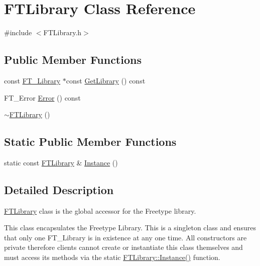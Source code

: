 \hypertarget{class_f_t_library}{}\section{F\+T\+Library Class Reference}
\label{class_f_t_library}


{\ttfamily \#include $<$F\+T\+Library.\+h$>$}

\subsection*{Public Member Functions}
\begin{DoxyCompactItemize}
\item 
const \hyperlink{struct_f_t___library_rec__}{F\+T\+\_\+\+Library} $\ast$const \hyperlink{class_f_t_library_afef4db019eae5a4307201b7abc6a88c7}{Get\+Library} () const 
\item 
F\+T\+\_\+\+Error \hyperlink{class_f_t_library_ad01e538ba8e308dddda5c4ec808ee404}{Error} () const 
\item 
\hyperlink{class_f_t_library_a8d1ee3dc3c4916b5b428e934dc46e9d7}{$\sim$\+F\+T\+Library} ()
\end{DoxyCompactItemize}
\subsection*{Static Public Member Functions}
\begin{DoxyCompactItemize}
\item 
static const \hyperlink{class_f_t_library}{F\+T\+Library} \& \hyperlink{class_f_t_library_aa172665a8db8888851895bcb15aa8103}{Instance} ()
\end{DoxyCompactItemize}


\subsection{Detailed Description}
\hyperlink{class_f_t_library}{F\+T\+Library} class is the global accessor for the Freetype library.

This class encapsulates the Freetype Library. This is a singleton class and ensures that only one F\+T\+\_\+\+Library is in existence at any one time. All constructors are private therefore clients cannot create or instantiate this class themselves and must access it\textquotesingle{}s methods via the static {\ttfamily \hyperlink{class_f_t_library_aa172665a8db8888851895bcb15aa8103}{F\+T\+Library\+::\+Instance()}} function.

